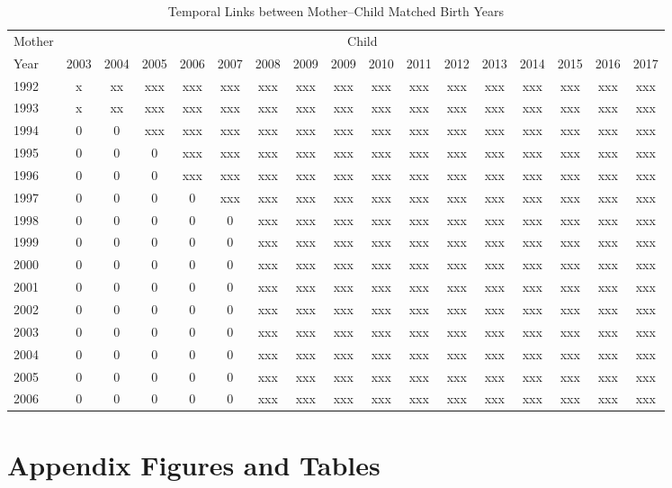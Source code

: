 \documentclass[11pt]{article}
\begin{document}
\begin{appendices}
    
  \begin{landscape}
  \begin{table}[htpb!]
    \centering
    \caption{Temporal Links between Mother--Child Matched Birth Years}
    \label{tab:birthChart}
    \begin{tabular}{lcccccccccccccccc} \toprule
    Mother & \multicolumn{16}{c}{Child} \\ \cmidrule(r){2-17}
    Year & 2003 & 2004 & 2005 & 2006 & 2007 & 2008 & 2009 & 2009 & 2010 & 2011 & 2012 & 2013 & 2014 & 2015 & 2016 & 2017 \\ \midrule
    1992 & x & xx & xxx & xxx & xxx & xxx & xxx & xxx & xxx & xxx & xxx & xxx & xxx & xxx & xxx & xxx \\
    1993 & x & xx & xxx & xxx & xxx & xxx & xxx & xxx & xxx & xxx & xxx & xxx & xxx & xxx & xxx & xxx \\
    1994 & 0 & 0  & xxx & xxx & xxx & xxx & xxx & xxx & xxx & xxx & xxx & xxx & xxx & xxx & xxx & xxx \\
    1995 & 0 & 0  & 0   & xxx & xxx & xxx & xxx & xxx & xxx & xxx & xxx & xxx & xxx & xxx & xxx & xxx \\
    1996 & 0 & 0  & 0   & xxx & xxx & xxx & xxx & xxx & xxx & xxx & xxx & xxx & xxx & xxx & xxx & xxx \\
    1997 & 0 & 0  & 0   & 0   & xxx & xxx & xxx & xxx & xxx & xxx & xxx & xxx & xxx & xxx & xxx & xxx \\
    1998 & 0 & 0  & 0   & 0   & 0   & xxx & xxx & xxx & xxx & xxx & xxx & xxx & xxx & xxx & xxx & xxx \\
    1999 & 0 & 0  & 0   & 0   & 0   & xxx & xxx & xxx & xxx & xxx & xxx & xxx & xxx & xxx & xxx & xxx \\
    2000 & 0 & 0  & 0   & 0   & 0   & xxx & xxx & xxx & xxx & xxx & xxx & xxx & xxx & xxx & xxx & xxx \\
    2001 & 0 & 0  & 0   & 0   & 0   & xxx & xxx & xxx & xxx & xxx & xxx & xxx & xxx & xxx & xxx & xxx \\
    2002 & 0 & 0  & 0   & 0   & 0   & xxx & xxx & xxx & xxx & xxx & xxx & xxx & xxx & xxx & xxx & xxx \\
    2003 & 0 & 0  & 0   & 0   & 0   & xxx & xxx & xxx & xxx & xxx & xxx & xxx & xxx & xxx & xxx & xxx \\
    2004 & 0 & 0  & 0   & 0   & 0   & xxx & xxx & xxx & xxx & xxx & xxx & xxx & xxx & xxx & xxx & xxx \\
    2005 & 0 & 0  & 0   & 0   & 0   & xxx & xxx & xxx & xxx & xxx & xxx & xxx & xxx & xxx & xxx & xxx \\
    2006 & 0 & 0  & 0   & 0   & 0   & xxx & xxx & xxx & xxx & xxx & xxx & xxx & xxx & xxx & xxx & xxx \\
    \bottomrule
    \end{tabular}
  \end{table}
  \end{landscape}


  \clearpage
  \section{Appendix Figures and Tables}
    
  \end{appendices}
\end{document}
